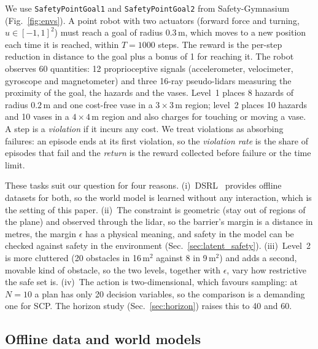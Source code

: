 We use \texttt{SafetyPointGoal1} and \texttt{SafetyPointGoal2} from Safety-Gymnasium~\citep{ji2023safety}
(Fig.~\ref{fig:envs}). A point robot with two actuators (forward force and turning, $u\in[-1,1]^2$) must reach a goal
of radius $0.3$\,m, which moves to a new position each time it is reached, within $T=1000$ steps. The reward is the
per-step reduction in distance to the goal plus a bonus of 1 for reaching it. The robot observes 60 quantities: 12
proprioceptive signals (accelerometer, velocimeter, gyroscope and magnetometer) and three 16-ray pseudo-lidars measuring
the proximity of the goal, the hazards and the vases. Level~1 places 8 hazards of radius $0.2$\,m and one cost-free
vase in a $3\times3$\,m region; level~2 places 10 hazards and 10 vases in a $4\times4$\,m region and also charges for
touching or moving a vase. A step is a \emph{violation} if it incurs any cost. We treat violations as absorbing
failures: an episode ends at its first violation, so the \emph{violation rate} is the share of episodes that fail and
the \emph{return} is the reward collected before failure or the time limit.

These tasks suit our question for four reasons.
(i)~DSRL~\citep{liu2023datasets} provides offline datasets for both, so the world model is learned without any
interaction, which is the setting of this paper.
(ii)~The constraint is geometric (stay out of regions of the plane) and observed through the lidar, so the barrier's
margin is a distance in metres, the margin $\epsilon$ has a physical meaning, and safety in the model can be checked
against safety in the environment (Sec.~\ref{sec:latent_safety}).
(iii)~Level~2 is more cluttered (20 obstacles in 16\,m$^2$ against 8 in 9\,m$^2$) and adds a second, movable kind of
obstacle, so the two levels, together with $\epsilon$, vary how restrictive the safe set is.
(iv)~The action is two-dimensional, which favours sampling: at $N=10$ a plan has only 20 decision variables, so the
comparison is a demanding one for SCP. The horizon study (Sec.~\ref{sec:horizon}) raises this to 40 and 60.

\subsection{Offline data and world models}\label{sec:wm_setup}

